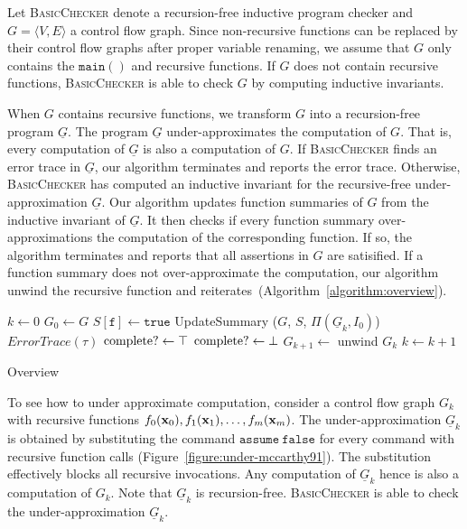 
Let \textsc{BasicChecker} denote a recursion-free inductive program
checker and $G = \langle V, E \rangle$ a control flow graph. Since
non-recursive functions can be replaced by their control flow graphs
after proper variable renaming, we assume that $G$ only contains the
$\mathtt{main()}$ and recursive functions. If $G$ does not contain
recursive functions, \textsc{BasicChecker} is able to check $G$ by
computing inductive invariants.

When $G$ contains recursive functions, we transform $G$ into a
recursion-free program $\underline{G}$. The program $\underline{G}$
under-approximates the computation of $G$. That is, every computation
of $\underline{G}$ is also a computation of $G$. If
\textsc{BasicChecker} finds an error trace in $\underline{G}$, our
algorithm terminates and reports the error trace. Otherwise,
\textsc{BasicChecker} has computed an inductive invariant for the
recursive-free under-approximation $\underline{G}$. Our algorithm
updates function summaries of $G$ from the inductive invariant of
$\underline{G}$. It then checks if every function summary
over-approximations the computation of the corresponding function. If
so, the algorithm terminates and reports that all assertions in $G$
are satisified. If a function summary does not over-approximate the
computation, our algorithm unwind the recursive function and
reiterates~(Algorithm~\ref{algorithm:overview}).

\begin{algorithm}
  $k \leftarrow 0$\;
  $G_0 \leftarrow G$\;
  {
    $S[\mathtt{f}] \leftarrow \mathtt{true}$\;
  }
  {
    {
      {    
        UpdateSummary ($G$, $S$, $\Pi (\underline{G}_k, I_0)$)\;
      }
      {
        \Return $\mathit{ErrorTrace} (\tau)$\;
      }
    }
    $\textmd{complete?} \leftarrow \top$\;
    {
      {
        $\textmd{complete?} \leftarrow \bot$\;
      }
    }
    $G_{k+1} \leftarrow $ unwind $G_k$\;
    $k \leftarrow k + 1$\;
  }
  \caption{Overview}
  \label{algorithm:overview}
\end{algorithm}

To see how to under approximate computation, consider a control flow
graph $G_k$ with recursive functions $f_0 (\textbf{x}_0), f_1 (\textbf{x}_1),
\ldots, f_m (\textbf{x}_m)$. The under-approximation $\underline{G}_k$ is
obtained by substituting the command $\mathtt{assume\ false}$ for
every command with recursive function calls
(Figure~\ref{figure:under-mccarthy91}). The substitution
effectively blocks all recursive invocations. Any computation of
$\underline{G}_k$ hence is also a computation of $G_k$. Note that
$\underline{G}_k$ is recursion-free. \textsc{BasicChecker} is able to
check the under-approximation $\underline{G}_k$.

